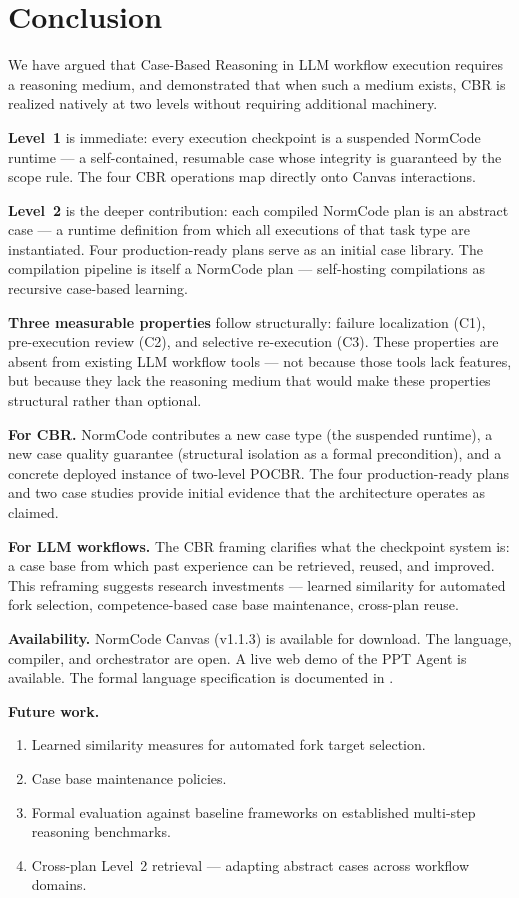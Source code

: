 \section{Conclusion}
\label{sec:conclusion}

We have argued that Case-Based Reasoning in LLM workflow execution requires a reasoning
medium, and demonstrated that when such a medium exists, CBR is realized natively at
two levels without requiring additional machinery.

\textbf{Level~1} is immediate: every execution checkpoint is a suspended NormCode
runtime --- a self-contained, resumable case whose integrity is guaranteed by the scope
rule. The four CBR operations map directly onto Canvas interactions.

\textbf{Level~2} is the deeper contribution: each compiled NormCode plan is an abstract
case --- a runtime definition from which all executions of that task type are
instantiated. Four production-ready plans serve as an initial case library. The
compilation pipeline is itself a NormCode plan --- self-hosting compilations as
recursive case-based learning.

\textbf{Three measurable properties} follow structurally: failure localization (C1),
pre-execution review (C2), and selective re-execution (C3). These properties
are absent from existing LLM workflow tools --- not because those tools lack features,
but because they lack the reasoning medium that would make these properties structural
rather than optional.

\textbf{For CBR.} NormCode contributes a new case type (the suspended runtime), a new
case quality guarantee (structural isolation as a formal precondition), and a concrete
deployed instance of two-level POCBR. The four production-ready plans and two case
studies provide initial evidence that the architecture operates as claimed.

\textbf{For LLM workflows.} The CBR framing clarifies what the checkpoint system is: a
case base from which past experience can be retrieved, reused, and improved. This
reframing suggests research investments --- learned similarity for automated fork
selection, competence-based case base maintenance, cross-plan reuse.

\textbf{Availability.} NormCode Canvas (v1.1.3) is available for download. The language,
compiler, and orchestrator are open. A live web demo of the PPT Agent is available. The
formal language specification is documented in \cite{anon2025}.

\textbf{Future work.}
\begin{enumerate}
  \item Learned similarity measures for automated fork target selection.
  \item Case base maintenance policies.
  \item Formal evaluation against baseline frameworks on established multi-step
    reasoning benchmarks.
  \item Cross-plan Level~2 retrieval --- adapting abstract cases across workflow domains.
\end{enumerate}
